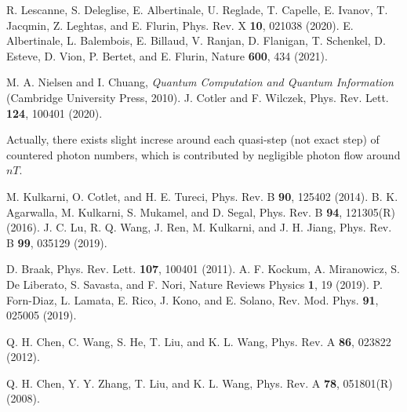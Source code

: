 \documentclass[twocolumn,showpacs,preprintnumbers,amsmath,amssymb]{revtex4}
\begin{document}
\begin{thebibliography}{99}
		
		R. Lescanne, S. Deleglise, E. Albertinale, U. Reglade, T. Capelle, E. Ivanov, T. Jacqmin, Z. Leghtas, and E. Flurin,
		Phys. Rev. X \textbf{10}, 021038 (2020).
		E. Albertinale, L. Balembois, E. Billaud, V. Ranjan, D. Flanigan, T. Schenkel, D. Esteve, D. Vion, P. Bertet, and E. Flurin,
		Nature \textbf{600}, 434 (2021).
		
M. A. Nielsen and I. Chuang, \emph{Quantum Computation and
Quantum Information} (Cambridge University Press, 2010).
J. Cotler and F. Wilczek, Phys. Rev. Lett. \textbf{124}, 100401 (2020).

        Actually, there exists slight increse around each quasi-step (not exact step) of countered photon numbers, which is contributed by negligible photon flow around $nT$.

		M. Kulkarni, O. Cotlet, and H. E. Tureci,
		Phys. Rev. B \textbf{90}, 125402 (2014).
		B. K. Agarwalla, M. Kulkarni, S. Mukamel, and D. Segal,
		Phys. Rev. B \textbf{94}, 121305(R) (2016).
		J. C. Lu, R. Q. Wang, J. Ren, M. Kulkarni, and J. H. Jiang,
		Phys. Rev. B \textbf{99}, 035129 (2019).
		
		D. Braak,
		Phys. Rev. Lett. \textbf{107}, 100401  (2011).
		A. F. Kockum, A. Miranowicz, S. De Liberato, S. Savasta, and F. Nori,
		Nature Reviews Physics \textbf{1}, 19 (2019).
		P. Forn-Diaz, L. Lamata, E. Rico, J. Kono, and E. Solano,
		Rev. Mod. Phys. \textbf{91}, 025005 (2019).
		
		Q. H. Chen, C. Wang, S. He, T. Liu, and K. L. Wang,
		Phys. Rev. A \textbf{86}, 023822 (2012).
		
        Q. H. Chen, Y. Y. Zhang, T. Liu, and K. L. Wang, Phys. Rev. A \textbf{78}, 051801(R) (2008).


\end{thebibliography}
\end{document}
